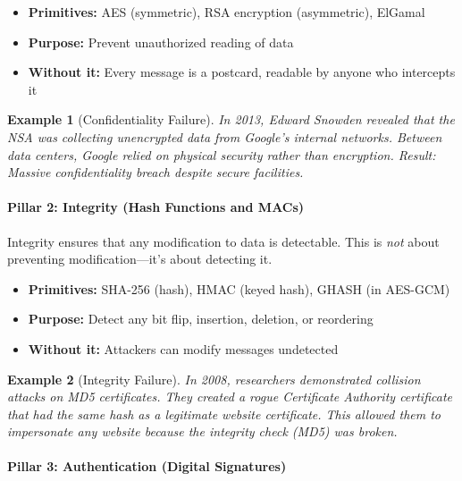 \documentclass[11pt,a4paper]{article}
\newtheorem{example}{Example}
\begin{document}
\begin{itemize}
    \item \textbf{Primitives:} AES (symmetric), RSA encryption (asymmetric), ElGamal
    \item \textbf{Purpose:} Prevent unauthorized reading of data
    \item \textbf{Without it:} Every message is a postcard, readable by anyone who intercepts it
\end{itemize}

\begin{example}[Confidentiality Failure]
In 2013, Edward Snowden revealed that the NSA was collecting unencrypted data from Google's internal networks. Between data centers, Google relied on physical security rather than encryption. Result: Massive confidentiality breach despite secure facilities.
\end{example}

\paragraph{Pillar 2: Integrity (Hash Functions and MACs)}

Integrity ensures that any modification to data is detectable. This is \emph{not} about preventing modification---it's about detecting it.

\begin{itemize}
    \item \textbf{Primitives:} SHA-256 (hash), HMAC (keyed hash), GHASH (in AES-GCM)
    \item \textbf{Purpose:} Detect any bit flip, insertion, deletion, or reordering
    \item \textbf{Without it:} Attackers can modify messages undetected
\end{itemize}

\begin{example}[Integrity Failure]
In 2008, researchers demonstrated collision attacks on MD5 certificates. They created a rogue Certificate Authority certificate that had the same hash as a legitimate website certificate. This allowed them to impersonate \emph{any} website because the integrity check (MD5) was broken.
\end{example}

\paragraph{Pillar 3: Authentication (Digital Signatures)}
\end{document}
